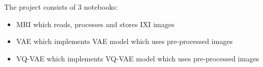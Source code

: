 The project consists of 3 notebooks:

\begin{itemize}
    \item MRI which reads, processes and stores IXI images
    \item VAE which implements VAE model which uses pre-processed images
    \item VQ-VAE which implements VQ-VAE model which uses pre-processed images
\end{itemize}





